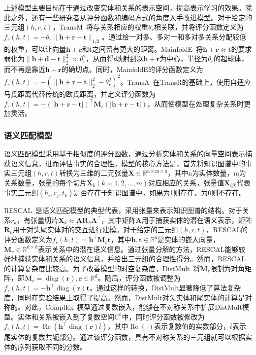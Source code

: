 \documentclass[algorithmlist, AutoFakeBold, AutoFakeSlant, figurelist, tablelist, nomlist, engineering]{seuthesix}
\begin{document}
上述模型主要目标在于通过改变实体和关系的表示空间，提高表示学习的效果。除此之外，还有一些研究者从评分函数和编码方式的角度入手改进模型。对于给定的三元组$(h, r, t)$，TransM~\cite{fan2014transition}将与关系相应的权重$\theta_r$相关联，并将评分函数定义为$f_r(h, t)=-\theta_r\|\bm{h} + \bm{r} - \bm{t}\|_{1 / 2}$。通过给一对多、多对一和多对多关系分配较低的权重，可以让向量$\bm{h} + \bm{r}$和$\bm{t}$之间留有更大的距离。MainfoldE~\cite{xiao2016one}将$\bm{h} + \bm{r} \approx \bm{t}$的要求弱化为$\|\bm{h} + \bm{d} - \bm{t}\|_2^2 \approx \theta_r^2$，从而将$t$映射到以$\bm{h} + \bm{r}$为中心，半径为$\theta_r$的超球体，而不再是靠近$\bm{h} + \bm{r}$的确切点。同时，MainfoldE的评分函数定义为$f_r(h, t) = -\left(\|\bm{h} + \bm{r} - \bm{t}\|_2^2 - \theta_r^2\right)^2$。TransA~\cite{xiao2015transa}在TransR的基础上，使用自适应马氏距离代替传统的欧氏距离，并定义评分函数为$f_r(h, t) = -(|\bm{h} + \bm{r} - \bm{t}|)^{\top} \mathbf{M}_r(|\bm{h} + \bm{r} - \bm{t}|)$，从而使模型在处理复杂关系时更加灵活。

\subsubsection{语义匹配模型}
语义匹配模型采用基于相似度的评分函数，通过分析实体和关系的向量空间表示捕获语义信息，进而评估事实的合理性。模型的核心方法是，首先将知识图谱中的事实三元组$(h, r, t)$转换为三维的二元张量$\mathbf{X} \in \mathbb{R}^{\mathrm{n \times m \times n}}$，其中n为实体数量，m为关系数量，张量的每个切片$\mathbf{X}_k(k=1,2, \ldots, m)$对应相应的关系，张量值$\mathbf{X}_{i j k}$代表事实三元组$\left(h_i, r_j, t_k\right)$是否存在于知识图谱中，如果为1则存在，为0则不存在。

RESCAL~\cite{nickel2011three}是语义匹配模型的典型代表，采用张量来表示知识图谱的结构。对于关系$r_k$，有张量切片$\mathbf{X}_k \approx \mathbf{A} \mathbf{R}_k \mathbf{A}^{\top}$，其中矩阵$\mathbf{A}$用于捕获实体的潜在语义表示，矩阵$\mathbf{R}_k$用于对头尾实体对的交互进行建模。对于给定的三元组$(h, r, t)$，RESCAL的评分函数定义为$f_r(h, t)=\bm{h}^{\top} \mathbf{M}_r \bm{t}$，其中$\bm{h}, \bm{t} \in \mathbb{R}^d$是实体的嵌入向量，$\mathbf{M}_r \in \mathbb{R}^\mathrm{d \times d}$表示关系中的潜在语义信息。通过张量分解的方法，RESCAL能够较好地捕获实体和关系的语义信息，并给出三元组的合理性得分。然而，RESCAL的计算复杂度比较高。为了改善模型的时空复杂度，DistMult~\cite{yang2015embedding}将$\mathbf{M}_r$限制为对角矩阵，即$\mathbf{M}_r=\operatorname{diag}(\bm{r}), \bm{r} \in \mathbb{R}^\mathrm{d}$。随后，评分函数被调整为$f_r(h, t)=-\bm{h}^{\top} \operatorname{diag}(\bm{r}) \bm{t}$。通过这样的转换，DistMult显著降低了算法复杂度，同时在实验结果上取得了提高。然而，DistMult对头实体和尾实体的计算是对称的。对此，ComplEx~\cite{trouillon2016complex}模型通过复数嵌入，能够在不对称关系中扩展DistMult模型。实体和关系被嵌入到了复数空间$\mathbb{C}^\mathrm{d}$中，同时评分函数被修改为$f_r(h, t)=\operatorname{Re}\left(\bm{h}^{\top} \operatorname{diag}(\bm{r}) \bar{t}\right)$，其中$\operatorname{Re}(\cdot)$表示复数值的实数部分，$\bar{t}$表示尾实体的复数共轭部分。通过该评分函数，具有不对称关系的三元组就可以根据实体的序列获取不同的分数。
\end{document}
